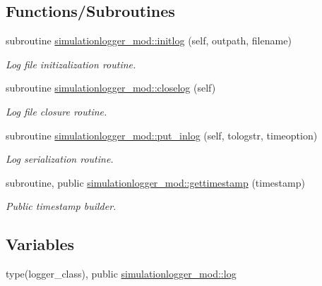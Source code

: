 \subsection*{Functions/\+Subroutines}
\begin{DoxyCompactItemize}
\item 
subroutine \mbox{\hyperlink{namespacesimulationlogger__mod_a7f4423ce42b0a9717110bd78028cec45}{simulationlogger\+\_\+mod\+::initlog}} (self, outpath, filename)
\begin{DoxyCompactList}\small\item\em Log file initizalization routine. \end{DoxyCompactList}\item 
subroutine \mbox{\hyperlink{namespacesimulationlogger__mod_a9cad2fd4ad67dc229286f94b0444cb86}{simulationlogger\+\_\+mod\+::closelog}} (self)
\begin{DoxyCompactList}\small\item\em Log file closure routine. \end{DoxyCompactList}\item 
subroutine \mbox{\hyperlink{namespacesimulationlogger__mod_a3bf437b875b454ef326a3bc660542539}{simulationlogger\+\_\+mod\+::put\+\_\+inlog}} (self, tologstr, timeoption)
\begin{DoxyCompactList}\small\item\em Log serialization routine. \end{DoxyCompactList}\item 
subroutine, public \mbox{\hyperlink{namespacesimulationlogger__mod_abff1db7e1655cb59097146d78e650672}{simulationlogger\+\_\+mod\+::gettimestamp}} (timestamp)
\begin{DoxyCompactList}\small\item\em Public timestamp builder. \end{DoxyCompactList}\end{DoxyCompactItemize}
\subsection*{Variables}
\begin{DoxyCompactItemize}
\item 
type(logger\+\_\+class), public \mbox{\hyperlink{namespacesimulationlogger__mod_a0d667ffec2a1129f89f4bd8fe6dc8a43}{simulationlogger\+\_\+mod\+::log}}
\end{DoxyCompactItemize}
